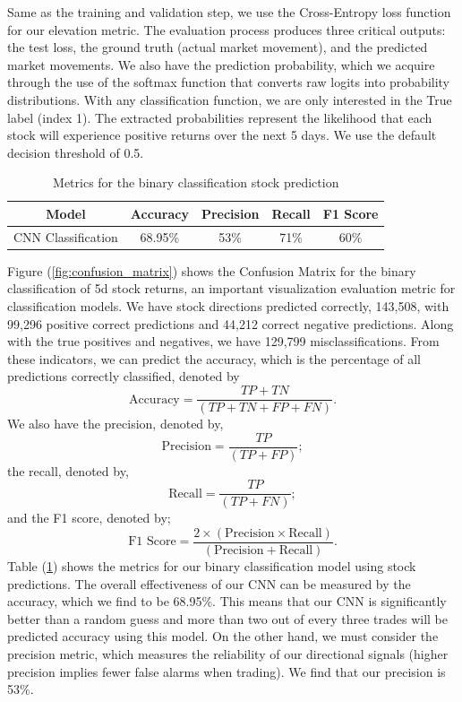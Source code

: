 \documentclass[12pt]{article}
\begin{document}
Same as the training and validation step, we use the Cross-Entropy loss function for our elevation metric. The evaluation process produces three critical outputs: the test loss, the ground truth (actual market movement), and the predicted market movements. We also have the prediction probability, which we acquire through the use of the softmax function that converts raw logits into probability distributions. With any classification function, we are only interested in the True label (index 1). The extracted probabilities represent the likelihood that each stock will experience positive returns over the next 5 days. We use the default decision threshold of 0.5.

\begin{table}[ht]
	\centering
	\caption{Metrics for the binary classification stock prediction}
	\begin{tabular}[t]{ccccc}
		\toprule
		Model & Accuracy & Precision & Recall & F1 Score \\
		\midrule
		CNN Classification & 68.95\% & 53\% & 71\% & 60\%  \\			
		\bottomrule
	\end{tabular}\label{tab:metrics}
\end{table}

Figure (\ref{fig:confusion_matrix}) shows the Confusion Matrix for the binary classification of 5d stock returns, an important visualization evaluation metric for classification models. We have stock directions predicted correctly, 143,508, with 99,296 positive correct predictions and 44,212 correct negative predictions. Along with the true positives and negatives, we have 129,799 misclassifications. From these indicators, we can predict the accuracy, which is the percentage of all predictions correctly classified, denoted by
\begin{equation}
	\text{Accuracy}=\frac{TP+TN}{(TP+TN+FP+FN)}.
\end{equation}
We also have the precision, denoted by,
\begin{equation}
	\text{Precision}=\frac{TP}{(TP+FP)};
\end{equation}
the recall, denoted by,
\begin{equation}
	\text{Recall}=\frac{TP}{(TP+FN)};
\end{equation}
and the F1 score, denoted by;
\begin{equation}
	\text{F1 Score}=\frac{2\times (\text{Precision}\times\text{Recall})}{(\text{Precision}+\text{Recall})}.
\end{equation}
Table (\ref{tab:metrics}) shows the metrics for our binary classification model using stock predictions. The overall effectiveness of our CNN can be measured by the accuracy, which we find to be 68.95\%. This means that our CNN is significantly better than a random guess and more than two out of every three trades will be predicted accuracy using this model. On the other hand, we must consider the precision metric, which measures the reliability of our directional signals (higher precision implies fewer false alarms when trading). We find that our precision is 53\%.
\end{document}
